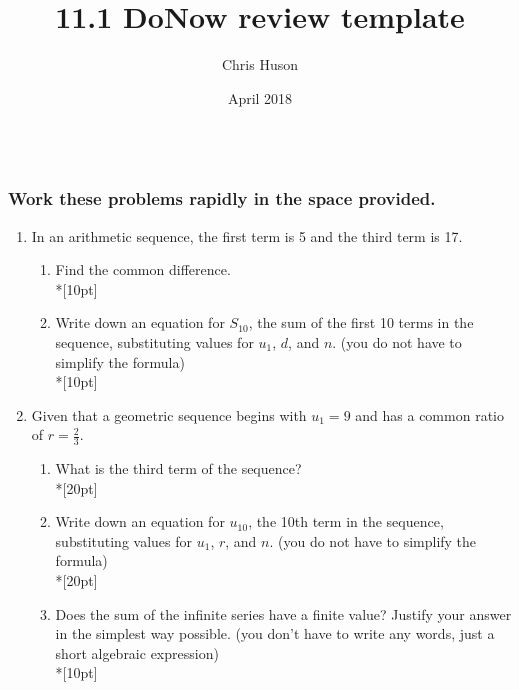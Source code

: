 \documentclass[12pt, oneside]{article}
\title{11.1 DoNow review template}
\author{Chris Huson}
\date{April 2018}
\begin{document}
\subsubsection*{\\ \textnormal{Work these problems rapidly in the space provided.}}

\begin{enumerate}
\item In an arithmetic sequence, the first term is 5 and the third term is 17.
\begin{enumerate}
    \item Find the common difference.\\*[10pt]
    \item Write down an equation for $S_{10}$, the sum of the first 10 terms in the sequence, substituting values for $u_1$, $d$, and $n$. (you do not have to simplify the formula)\\*[10pt]
\end{enumerate}

\item Given that a geometric sequence begins with $u_1=9$ and has a common ratio of $r=\frac{2}{3}$.
\begin{enumerate}
    \item What is the third term of the sequence?\\*[20pt]
    \item Write down an equation for $u_{10}$, the 10th term in the sequence, substituting values for $u_1$, $r$, and $n$. (you do not have to simplify the formula)\\*[20pt]
    \item Does the sum of the infinite series have a finite value? Justify your answer in the simplest way possible. (you don't have to write any words, just a short algebraic expression)\\*[10pt]
\end{enumerate}


\end{enumerate}
\end{document}
